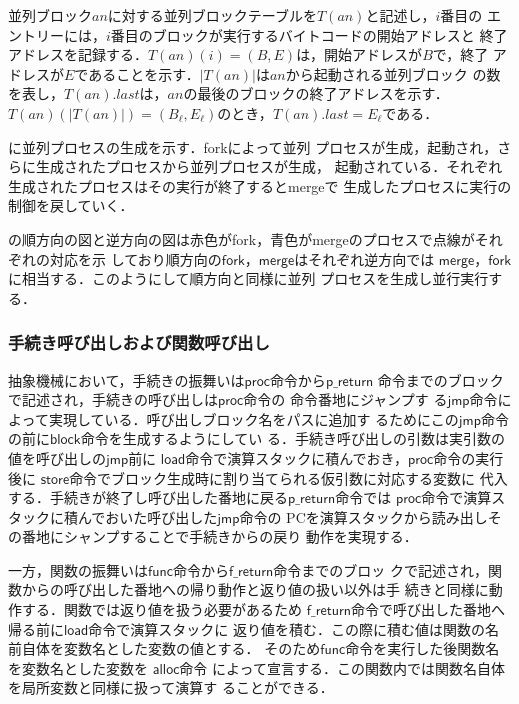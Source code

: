 \documentclass[submit,PRO]{ipsj}
\newcommand{\bcode}[1]{$\mathsf{#1}$}
\begin{document}
並列ブロック$an$に対する並列ブロックテーブルを$T(an)$と記述し，$i$番目の
エントリーには，$i$番目のブロックが実行するバイトコードの開始アドレスと
終了アドレスを記録する．$T(an)(i)=(B,E)$は，開始アドレスが$B$で，終了
アドレスが$E$であることを示す．$|T(an)|$は$an$から起動される並列ブロック
の数を表し，$T(an).last$は，$an$の最後のブロックの終了アドレスを示す．
$T(an)(|T(an)|)=(B_\ell,E_\ell)$のとき，$T(an).last=E_\ell$である．

に並列プロセスの生成を示す．forkによって並列
プロセスが生成，起動され，さらに生成されたプロセスから並列プロセスが生成，
起動されている．それぞれ生成されたプロセスはその実行が終了するとmergeで
生成したプロセスに実行の制御を戻していく．

の順方向の図と逆方向の図は赤色がfork，青色がmergeのプロセスで点線がそれぞれの対応を示
しており順方向の\bcode{fork}，\bcode{merge}はそれぞれ逆方向では
\bcode{merge}，\bcode{fork}に相当する．このようにして順方向と同様に並列
プロセスを生成し並行実行する．

\subsubsection{手続き呼び出しおよび関数呼び出し}

抽象機械において，手続きの振舞いは\bcode{proc}命令から\bcode{p\_return}
命令までのブロックで記述され，手続きの呼び出しは\bcode{proc}命令の
命令番地にジャンプす
る\bcode{jmp}命令によって実現している．呼び出しブロック名をパスに追加す
るためにこの\bcode{jmp}命令の前に\bcode{block}命令を生成するようにしてい
る．手続き呼び出しの引数は実引数の値を呼び出しの\bcode{jmp}前に
\bcode{load}命令で演算スタックに積んでおき，\bcode{proc}命令の実行後に
\bcode{store}命令でブロック生成時に割り当てられる仮引数に対応する変数に
代入する．手続きが終了し呼び出した番地に戻る\bcode{p\_return}命令では
\bcode{proc}命令で演算スタックに積んでおいた呼び出した\bcode{jmp}命令の
PCを演算スタックから読み出しその番地にシャンプすることで手続きからの戻り
動作を実現する．

一方，関数の振舞いは\bcode{func}命令から\bcode{f\_return}命令までのブロッ
クで記述され，関数からの呼び出した番地への帰り動作と返り値の扱い以外は手
続きと同様に動作する．関数では返り値を扱う必要があるため
\bcode{f\_return}命令で呼び出した番地へ帰る前に\bcode{load}命令で演算スタックに
返り値を積む．この際に積む値は関数の名前自体を変数名とした変数の値とする．
そのため\bcode{func}命令を実行した後関数名を変数名とした変数を
\bcode{alloc}命令
によって宣言する．この関数内では関数名自体を局所変数と同様に扱って演算す
ることができる．
\end{document}
